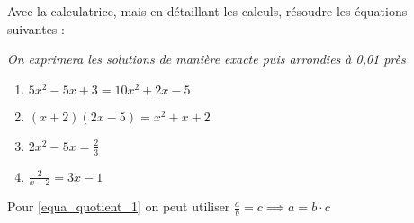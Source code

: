 \begin{exo}[type=solution]
Avec la calculatrice, mais en détaillant les calculs, résoudre les équations suivantes :

{\it On exprimera les solutions de manière exacte puis arrondies à 0,01 près}


\begin{enumerate}[label=\bf{\alph*})\,]
\item $5x^2-5x+3 = 10x^2+2x-5$
\item $(x+2)(2x-5) = x^2+x +2$
\item $2x^2-5x=\frac{2}{3}$ 
\item $\frac{2}{x-2}=3x-1$ \label{equa_quotient_1}

\end{enumerate}

\begin{sol}
Pour \ref{equa_quotient_1}  on peut utiliser $\frac{a}{b}=c \implies a = b \cdot c$ 
\end{sol}


\end{exo}








%


